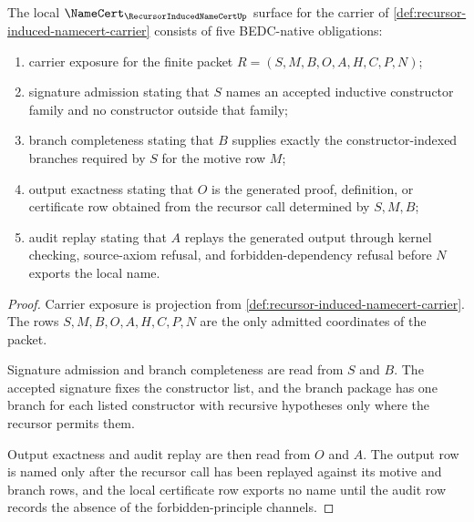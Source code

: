 \begin{theorem}
\label{thm:recursor-generator-namecert-obligation-surface}
The local $\NameCert_{\RecursorInducedNameCertUp}$ surface for the carrier of \autoref{def:recursor-induced-namecert-carrier} consists of five BEDC-native obligations:
\begin{enumerate}
\item carrier exposure for the finite packet $R=(S,M,B,O,A,H,C,P,N)$;
\item signature admission stating that $S$ names an accepted inductive constructor family and no constructor outside that family;
\item branch completeness stating that $B$ supplies exactly the constructor-indexed branches required by $S$ for the motive row $M$;
\item output exactness stating that $O$ is the generated proof, definition, or certificate row obtained from the recursor call determined by $S,M,B$;
\item audit replay stating that $A$ replays the generated output through kernel checking, source-axiom refusal, and forbidden-dependency refusal before $N$ exports the local name.
\end{enumerate}
\end{theorem}
\begin{proof}
Carrier exposure is projection from \autoref{def:recursor-induced-namecert-carrier}. The rows $S,M,B,O,A,H,C,P,N$ are the only admitted coordinates of the packet.

Signature admission and branch completeness are read from $S$ and $B$. The accepted signature fixes the constructor list, and the branch package has one branch for each listed constructor with recursive hypotheses only where the recursor permits them.

Output exactness and audit replay are then read from $O$ and $A$. The output row is named only after the recursor call has been replayed against its motive and branch rows, and the local certificate row exports no name until the audit row records the absence of the forbidden-principle channels.
\end{proof}

